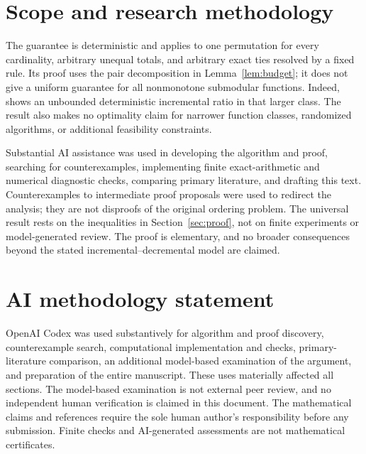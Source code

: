 \documentclass[acmsmall,screen,nonacm,11pt,natbib=false]{acmart}
\begin{document}
\section{Scope and research methodology}\label{sec:limits}

The guarantee is deterministic and applies to one permutation for every
cardinality, arbitrary unequal totals, and arbitrary exact ties resolved by
a fixed rule. Its proof uses the pair decomposition in
Lemma~\ref{lem:budget}; it does not give a uniform guarantee for all
nonmonotone submodular functions. Indeed,~\cite[Proposition~18]{DKLS26}
shows an unbounded deterministic incremental ratio in that larger class.
The result also makes no optimality claim for narrower function classes,
randomized algorithms, or additional feasibility constraints.

Substantial AI assistance was used in developing the algorithm and proof,
searching for counterexamples, implementing finite exact-arithmetic and
numerical diagnostic checks, comparing primary literature, and drafting
this text. Counterexamples to intermediate proof proposals were used to
redirect the analysis; they are not disproofs of the original ordering
problem. The universal result rests on the inequalities in
Section~\ref{sec:proof}, not on finite experiments or model-generated review.
The proof is elementary, and no broader consequences beyond the stated
incremental--decremental model are claimed.




\section*{AI methodology statement}
OpenAI Codex was used substantively for algorithm and proof discovery,
counterexample search, computational implementation and checks,
primary-literature comparison, an additional model-based examination of the
argument, and preparation of the entire manuscript. These uses materially
affected all sections. The model-based examination is not external peer
review, and no independent human verification is claimed in this document.
The mathematical claims and references require the sole human author's
responsibility before any submission. Finite checks and AI-generated
assessments are not mathematical certificates.
\end{document}
